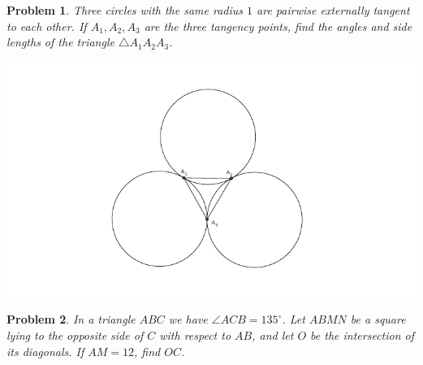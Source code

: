 \documentclass[a4paper,12pt]{article}
\theoremstyle{perfect}
\newtheorem{prb}{Problem}
\begin{document}
\begin{prb}
Three circles with the same radius $1$ are pairwise externally tangent to each other. If $A_1,A_2,A_3$ are the three tangency points, find the angles and side lengths of the triangle $\triangle A_1A_2A_3$.
\begin{center}
\includegraphics[scale=1.2]{three_circles.pdf}
\end{center}
\end{prb}

\begin{prb}
In a triangle $ABC$ we have $\angle ACB = 135^\circ$. Let $ABMN$ be a square lying to the opposite side of $C$ with respect to $AB$, and let $O$ be the intersection of its diagonals. If $AM = 12$, find $OC$.
\end{prb}
\end{document}
